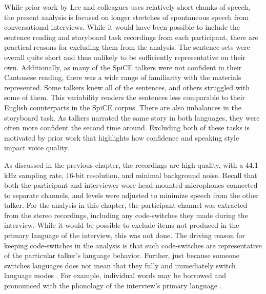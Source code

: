 While prior work by Lee and colleagues \citep[e.g.,][]{lee_2019_acoustic} uses relatively short chunks of speech, the present analysis is focused on longer stretches of spontaneous speech from conversational interviews. While it would have been possible to include the sentence reading and storyboard task recordings from each participant, there are practical reasons for excluding them from the analysis. The sentence sets were overall quite short and thus unlikely to be sufficiently representative on their own. Additionally, as many of the SpiCE talkers were not confident in their Cantonese reading, there was a wide range of familiarity with the materials represented. Some talkers knew all of the sentences, and others struggled with some of them. This variability renders the sentences less comparable to their English counterparts in the SpiCE corpus. There are also imbalances in the storyboard task. As talkers narrated the same story in both languages, they were often more confident the second time around. Excluding both of these tasks is motivated by prior work that highlights how confidence \citep{jarvinen_2013_speaking} and speaking style \citep{lee_2017_bilingual} impact voice quality. 

As discussed in the previous chapter, the recordings are high-quality, with a 44.1 kHz sampling rate, 16-bit resolution, and minimal background noise. Recall that both the participant and interviewer wore head-mounted microphones connected to separate channels, and levels were adjusted to minimize speech from the other talker. For the analysis in this chapter, the participant channel was extracted from the stereo recordings, including any code-switches they made during the interview. While it would be possible to exclude items not produced in the primary language of the interview, this was not done. The driving reason for keeping code-switches in the analysis is that such code-switches are representative of the particular talker's language behavior. Further, just because someone switches languages does not mean that they fully and immediately switch language modes \citep[e.g.,][]{fricke_2016_phonetic}. For example, individual words may be borrowed and pronounced with the phonology of the interview's primary language \citep[see, for example, the matrix language in code-switching][]{myersscotton_2011_matrix}. 

